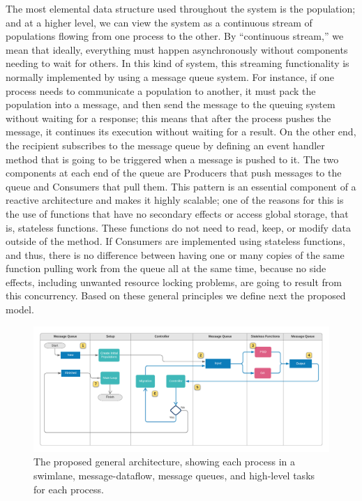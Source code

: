 \documentclass[review]{elsarticle}
\begin{document}
The most elemental data structure used throughout the system is the population; and at a higher
level, we can view the system as a continuous stream of populations
flowing from one process to the other. By ``continuous stream,'' we mean that ideally,
everything must happen asynchronously without components needing to wait for
others. In this kind of system, this streaming functionality is normally
implemented by using a message queue system. For instance, if one process needs
to communicate a population to another, it must pack the population into
a message, and then send the message 
to the queuing system without waiting for a response; this
means that after the process pushes the message, it continues its execution
without waiting for a result. On the other end, the recipient subscribes to the
message queue by defining an event handler method that is going to be triggered when a
message is pushed to it. The two components at each end of the queue are
Producers that push messages to the queue and Consumers that pull them. This
pattern is an essential component of a reactive architecture and makes
it highly scalable; one of the reasons for this is the use of functions
that have no secondary effects or access global storage, that is,
stateless functions. These functions do not need to read, keep, or modify data outside of the method. If
Consumers are implemented using stateless functions, and thus, there is no difference
between having one or many copies of the same function pulling work from the queue all at the
same time, because no side effects, including unwanted resource
locking problems,  are going to result from this concurrency.
Based on these general principles we define next the proposed model.


\begin{figure}
    \centering
    \includegraphics[width=\textwidth]{KafkEOsmall}
    \caption{The proposed general architecture, 
     showing each process in a swimlane, message-dataflow,
     message queues, and high-level tasks for each process.} 
    \label{fig:kafkEO}
\end{figure}
\end{document}
